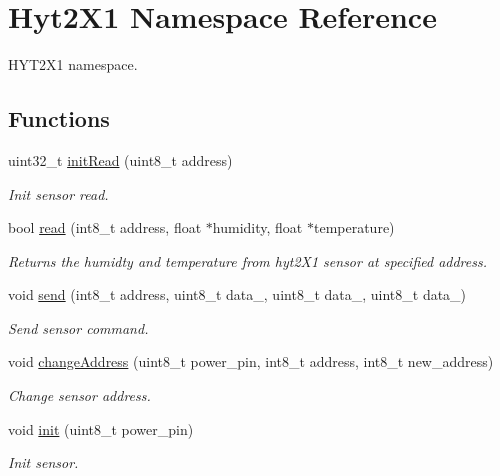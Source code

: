 \hypertarget{namespaceHyt2X1}{}\section{Hyt2\+X1 Namespace Reference}
\label{namespaceHyt2X1}


H\+Y\+T2\+X1 namespace.  


\subsection*{Functions}
\begin{DoxyCompactItemize}
\item 
uint32\+\_\+t \hyperlink{namespaceHyt2X1_a47e38827f637ac58bbcec76c238de87a}{init\+Read} (uint8\+\_\+t address)
\begin{DoxyCompactList}\small\item\em Init sensor read. \end{DoxyCompactList}\item 
bool \hyperlink{namespaceHyt2X1_ab2e26ccda85abca1e0d3f29bd5ea7039}{read} (int8\+\_\+t address, float $\ast$humidity, float $\ast$temperature)
\begin{DoxyCompactList}\small\item\em Returns the humidty and temperature from hyt2\+X1 sensor at specified address. \end{DoxyCompactList}\item 
void \hyperlink{namespaceHyt2X1_a4b974cad973a8aa5b8525c1c5cb85dd7}{send} (int8\+\_\+t address, uint8\+\_\+t data\+\_, uint8\+\_\+t data\+\_, uint8\+\_\+t data\+\_)
\begin{DoxyCompactList}\small\item\em Send sensor command. \end{DoxyCompactList}\item 
void \hyperlink{namespaceHyt2X1_a06824bbb5dc4a87a4cd51249b43ba9c2}{change\+Address} (uint8\+\_\+t power\+\_\+pin, int8\+\_\+t address, int8\+\_\+t new\+\_\+address)
\begin{DoxyCompactList}\small\item\em Change sensor address. \end{DoxyCompactList}\item 
void \hyperlink{namespaceHyt2X1_a128d06772378bc6c052b01094407950c}{init} (uint8\+\_\+t power\+\_\+pin)
\begin{DoxyCompactList}\small\item\em Init sensor. \end{DoxyCompactList}\item 

\end{DoxyCompactItemize}
